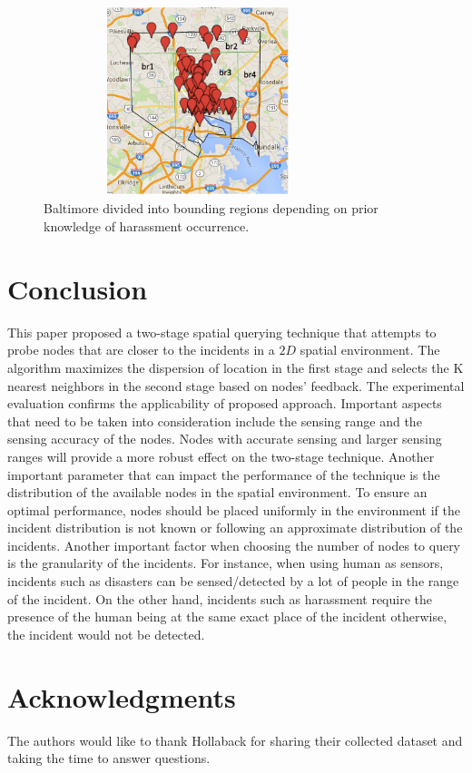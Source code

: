 \documentclass{acm_proc_article-sp}
\begin{document}
\begin{figure}[!h]
\centering
 \includegraphics[width=9cm ,height=5.5cm]{figuresPng/BaltimoreBr.png}
 \caption{Baltimore divided into bounding regions depending on prior knowledge of harassment occurrence.}
 \label{fig: BaltimoreRegions}
\end{figure}

\section{Conclusion}
This paper proposed a two-stage spatial querying technique that attempts to probe nodes that are closer to the incidents in a $2D$ spatial environment. The algorithm maximizes the dispersion of location in the first stage and selects the K nearest neighbors in the second stage based on nodes' feedback. The experimental evaluation confirms the applicability of proposed approach.
Important aspects that need to be taken into consideration include the sensing range and the sensing accuracy of the nodes. Nodes with accurate sensing and larger sensing ranges will provide a more robust effect on the two-stage technique. Another important parameter that can impact the performance of the technique is the distribution of the available nodes in the spatial environment. To ensure an optimal performance, nodes should be placed uniformly in the environment if the incident distribution is not known or following an approximate distribution of the incidents. Another important factor when choosing the number of nodes to query is the granularity of the incidents. For instance, when using human as sensors, incidents such as disasters can be sensed/detected by a lot of people in the range of the incident. On the other hand, incidents such as harassment require the presence of the human being at the same exact place of the incident otherwise, the incident would not be detected.

\section{Acknowledgments}
The authors would like to thank Hollaback for sharing their collected dataset and taking the time to answer questions.


{\footnotesize
}  %
%
%
\end{document}
